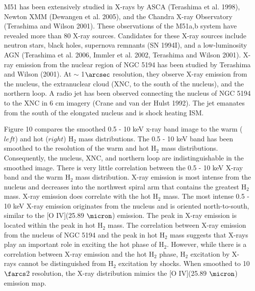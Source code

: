 \documentclass[manuscript]{aastex}
\begin{document}
M51 has been extensively studied in X-rays by ASCA (Terashima et al. 1998), Newton XMM (Dewangen et al. 2005), and  the Chandra X-ray Observatory (Terashima and Wilson 2001). These observations of the M51a,b system have revealed more than 80 X-ray sources.  Candidates for these X-ray sources include neutron stars, black holes, supernova remnants (SN 1994I), and a low-luminosity AGN (Terashima et al. 2006, Immler et al. 2002, Terashima and Wilson 2001).  X-ray emission from the nuclear region of NGC 5194 has been studied by Terashima and Wilson (2001).  At $\sim$ 1$\arcsec$ resolution, they observe X-ray emission from the nucleus, the extranuclear cloud (XNC, to the south of the nucleus), and the northern loop.  A radio jet has been observed connecting the nucleus of NGC 5194 to the XNC in 6 cm imagery (Crane and van der Hulst 1992).  The jet emanates from the south of the elongated nucleus and is shock heating ISM.

Figure 10 compares the smoothed 0.5 - 10 keV x-ray band image to the warm ($left$) and hot ($right$) $\mathrm{H_2}$ mass distributions.  The 0.5 - 10 keV band has been smoothed to the resolution of the warm and hot $\mathrm{H_2}$ mass distributions.  Consequently, the nucleus, XNC, and northern loop are indistinguishable in the smoothed image.
There is very little correlation between the 0.5 - 10 keV X-ray band and the warm $\mathrm{H_2}$ mass distribution.  X-ray emission is most intense from the nucleus and decreases into the northwest spiral arm that contains the greatest $\mathrm{H_2}$ mass.  X-ray emission does correlate with the hot $\mathrm{H_2}$ mass. The most intense 0.5 - 10 keV X-ray emission originates from the nucleus and is oriented north-to-south, similar to the [O IV](25.89 $\micron$) emission.
The peak in X-ray emission is located within the peak in hot $\mathrm{H_2}$ mass.  The correlation between X-ray emission from the nucleus of NGC 5194 and the peak in hot $\mathrm{H_2}$ mass suggests that X-rays play an important role in exciting the hot phase of $\mathrm{H_2}$.  However, while there is a correlation between X-ray emission and the hot $\mathrm{H_2}$ phase, $\mathrm{H_2}$ excitation by X-rays cannot be distinguished from $\mathrm{H_2}$ excitation by shocks.  When smoothed to 10$\farcs$2 resolution, the X-ray distribution mimics the [O IV](25.89 $\micron$) emission map.

\end{document}
